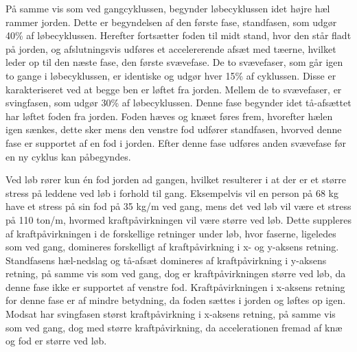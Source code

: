 På samme vis som ved gangcyklussen, begynder løbecyklussen idet højre hæl rammer jorden. Dette er begyndelsen af den første fase, standfasen, som udgør 40\% af løbecyklussen. Herefter fortsætter foden til midt stand, hvor den står fladt på jorden, og afslutningsvis udføres et accelererende afsæt med tæerne, hvilket leder op til den næste fase, den første svævefase. \citep{Adelaar1986,Novacheck1998} \newline
De to svævefaser, som går igen to gange i løbecyklussen, er identiske og udgør hver 15\% af cyklussen. Disse er karakteriseret ved at begge ben er løftet fra jorden. \citep{Adelaar1986,Novacheck1998} \newline
Mellem de to svævefaser, er svingfasen, som udgør 30\% af løbecyklussen. Denne fase begynder idet tå-afsættet har løftet foden fra jorden. Foden hæves og knæet føres frem, hvorefter hælen igen sænkes, dette sker mens den venstre fod udfører standfasen, hvorved denne fase er supportet af en fod i jorden. Efter denne fase udføres anden svævefase før en ny cyklus kan påbegyndes. \citep{Adelaar1986,Novacheck1998}

Ved løb rører kun én fod jorden ad gangen, hvilket resulterer i at der er et større stress på leddene ved løb i forhold til gang. Eksempelvis vil en person på 68 kg have et stress på sin fod på 35 kg/m ved gang, mens det ved løb vil være et stress på 110 ton/m, hvormed kraftpåvirkningen vil være større ved løb.\citep{Adelaar1986}
Dette suppleres af kraftpåvirkningen i de forskellige retninger under løb, hvor faserne, ligeledes som ved gang, domineres forskelligt af kraftpåvirkning i x- og y-aksens retning. \newline 
Standfasens hæl-nedslag og tå-afsæt domineres af kraftpåvirkning i y-aksens retning, på samme vis som ved gang, dog er kraftpåvirkningen større ved løb, da denne fase ikke er supportet af venstre fod. Kraftpåvirkningen i x-aksens retning for denne fase er af mindre betydning, da foden sættes i jorden og løftes op igen. 
Modsat har svingfasen størst kraftpåvirkning i x-aksens retning, på samme vis som ved gang, dog med større kraftpåvirkning, da accelerationen fremad af knæ og fod er større ved løb.\citep{Rueterbories2010} 


